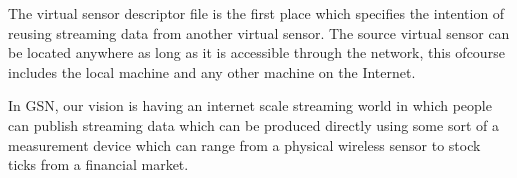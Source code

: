 The virtual sensor descriptor file is the first place which specifies the intention of reusing streaming data from another virtual sensor. The source virtual sensor can be located
anywhere as long as it is accessible through the network, this ofcourse includes the local machine and any other machine on the Internet. 


In GSN, our vision is having an internet scale streaming world in which people can publish streaming data which
can be produced directly using some sort of a measurement device which can range from a physical wireless sensor to stock ticks from a financial market.








